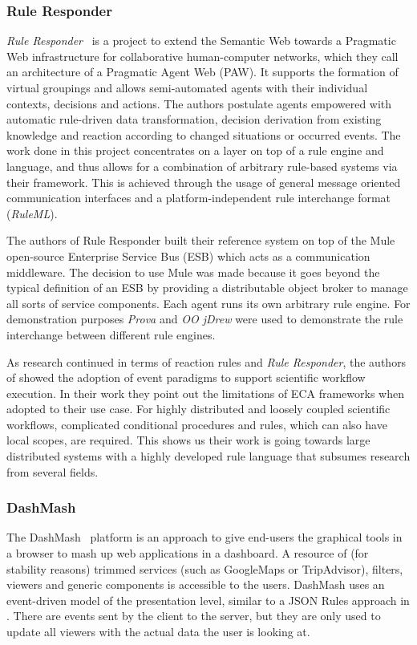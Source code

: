 \documentclass[11pt]{article}%
\begin{document}
\subsubsection{Rule Responder}
\emph{Rule Responder}~\cite{2007-Paschke_etal-RuleResponder.pdf} is a project to extend the Semantic Web towards a Pragmatic Web infrastructure for collaborative human-computer networks, which they call an architecture of a Pragmatic Agent Web (PAW). It supports the formation of virtual groupings and allows semi-automated agents with their individual contexts, decisions and actions. The authors postulate agents empowered with automatic rule-driven data transformation, decision derivation from existing knowledge and reaction according to changed situations or occurred events. The work done in this project concentrates on a layer on top of a rule engine and language, and thus allows for a combination of arbitrary rule-based systems via their framework. This is achieved through the usage of general message oriented communication interfaces and a platform-independent rule interchange format (\emph{RuleML}).

The authors of Rule Responder built their reference system\cite{wwwruleresponder} on top of the Mule~\cite{wwwmuleesb} open-source Enterprise Service Bus (ESB) which acts as a communication middleware. The decision to use Mule was made because it goes beyond the typical definition of an ESB by providing a distributable object broker to manage all sorts of service components. Each agent runs its own arbitrary rule engine. For demonstration purposes \emph{Prova} and \emph{OO jDrew} were used to demonstrate the rule interchange between different rule engines.

As research continued in terms of reaction rules and \textit{Rule Responder}, the authors of \cite{2013_Zhao-Paschke_EDSWE.pdf} showed the adoption of event paradigms to support scientific workflow execution. In their work they point out the limitations of ECA frameworks when adopted to their use case. For highly distributed and loosely coupled scientific workflows, complicated conditional procedures and rules, which can also have local scopes, are required. This shows us their work is going towards large distributed systems with a highly developed rule language that subsumes research from several fields.

\subsubsection{DashMash}
The DashMash~\cite{2011-Cappiello_etal-DashMash.pdf} platform is an approach to give end-users the graphical tools in a browser to mash up web applications in a dashboard. A resource of (for stability reasons) trimmed services (such as GoogleMaps or TripAdvisor), filters, viewers and generic components is accessible to the users. DashMash uses an event-driven model of the presentation level, similar to a JSON Rules approach in \cite{2009-Pascalau_Giurca-RBACEM.pdf}. There are events sent by the client to the server, but they are only used to update all viewers with the actual data the user is looking at.
\end{document}

